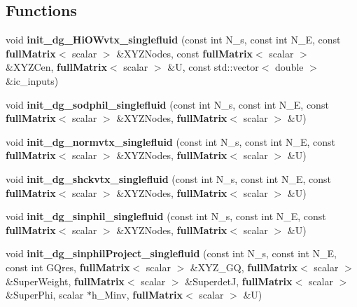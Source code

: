\subsection*{Functions}
\begin{DoxyCompactItemize}
\item 
void {\bfseries init\-\_\-dg\-\_\-\-Hi\-O\-Wvtx\-\_\-singlefluid} (const int N\-\_\-s, const int N\-\_\-\-E, const {\bf full\-Matrix}$<$ scalar $>$ \&X\-Y\-Z\-Nodes, const {\bf full\-Matrix}$<$ scalar $>$ \&X\-Y\-Z\-Cen, {\bf full\-Matrix}$<$ scalar $>$ \&U, const std\-::vector$<$ double $>$ \&ic\-\_\-inputs)\label{init__cond_8h_a8333da28129bd87c890cc62a3aab1f58}

\item 
void {\bfseries init\-\_\-dg\-\_\-sodphil\-\_\-singlefluid} (const int N\-\_\-s, const int N\-\_\-\-E, const {\bf full\-Matrix}$<$ scalar $>$ \&X\-Y\-Z\-Nodes, {\bf full\-Matrix}$<$ scalar $>$ \&U)\label{init__cond_8h_a1cc84f891d4ae3b8ceafb14a0b0989fb}

\item 
void {\bfseries init\-\_\-dg\-\_\-normvtx\-\_\-singlefluid} (const int N\-\_\-s, const int N\-\_\-\-E, const {\bf full\-Matrix}$<$ scalar $>$ \&X\-Y\-Z\-Nodes, {\bf full\-Matrix}$<$ scalar $>$ \&U)\label{init__cond_8h_a043fa3d53a043b04b9b7268fc3c8bed4}

\item 
void {\bfseries init\-\_\-dg\-\_\-shckvtx\-\_\-singlefluid} (const int N\-\_\-s, const int N\-\_\-\-E, const {\bf full\-Matrix}$<$ scalar $>$ \&X\-Y\-Z\-Nodes, {\bf full\-Matrix}$<$ scalar $>$ \&U)\label{init__cond_8h_a5075be7cc4df4aa1371daccbdaedae19}

\item 
void {\bfseries init\-\_\-dg\-\_\-sinphil\-\_\-singlefluid} (const int N\-\_\-s, const int N\-\_\-\-E, const {\bf full\-Matrix}$<$ scalar $>$ \&X\-Y\-Z\-Nodes, {\bf full\-Matrix}$<$ scalar $>$ \&U)\label{init__cond_8h_a0f965e297238e1bb6c228ecf9701a0cb}

\item 
void {\bfseries init\-\_\-dg\-\_\-sinphil\-Project\-\_\-singlefluid} (const int N\-\_\-s, const int N\-\_\-\-E, const int G\-Qres, {\bf full\-Matrix}$<$ scalar $>$ \&X\-Y\-Z\-\_\-\-G\-Q, {\bf full\-Matrix}$<$ scalar $>$ \&Super\-Weight, {\bf full\-Matrix}$<$ scalar $>$ \&Superdet\-J, {\bf full\-Matrix}$<$ scalar $>$ \&Super\-Phi, scalar $\ast$h\-\_\-\-Minv, {\bf full\-Matrix}$<$ scalar $>$ \&U)\label{init__cond_8h_acb7391b3bfc82323d6a99a3a4da4f7bd}


\end{DoxyCompactItemize}
